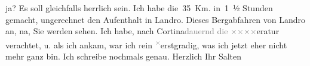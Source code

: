                ja? Es soll gleichfalls herrlich sein. Ich habe die 35 Km. in 1 ½ Stunden gemacht,
               ungerechnet den Aufenthalt in Landro. Dieses
               Bergabfahren von Landro an, na, Sie werden sehen.
               Ich habe, nach Cortina\textcolor{gray}{dauernd die}{ }\textcolor{gray}{×}\-\textcolor{gray}{×}\-\textcolor{gray}{×}\-\textcolor{gray}{×}eratur verachtet, u. als ich ankam, war ich
                  \textcolor{gray}{r}ein \substVorne{}\textsuperscript{\textcolor{gray}{×}}\substDazwischen{}e\substHinten{}rstgradig, was ich jetzt eher nicht
               mehr ganz bin. Ich schreibe nochmals genau. 
            \pend
           \pstart Herzlich Ihr \spacefill\mbox{Salten}\pend{}\endnumbering{}  
      